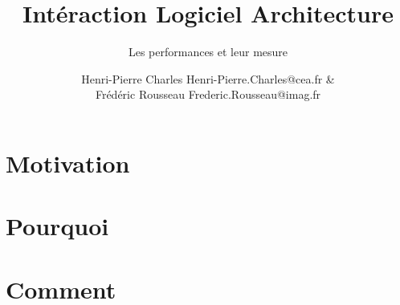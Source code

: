 \documentclass{beamer}
\title{Intéraction Logiciel Architecture}
\subtitle{Les performances et leur mesure}
\author{Henri-Pierre Charles Henri-Pierre.Charles@cea.fr \& \\
Frédéric Rousseau Frederic.Rousseau@imag.fr}
\date{}
\newcommand{\Slide}[1]{}
\begin{document}
\begin{frame}
\titlepage
\end{frame}

\section{Motivation}
\Slide{Metrics/Moore}
\Slide{Metrics/Top500}

\begin{frame}
\tableofcontents[ ] 
\end{frame}
\section{Pourquoi}
\Slide{Metrics/HowToMeasure}
\Slide{Metrics/FLOPS}
\Slide{Metrics/Sustained}
\Slide{Metrics/Lois}
\Slide{Metrics/Speedup}
\Slide{Metrics/Amdahl2}
\Slide{Metrics/Amdahl}
\Slide{Metrics/Roofline}
\Slide{Metrics/Roofline2}

\section{Comment}
\Slide{Comment/gprof}
\Slide{Comment/PerfCounter}
\Slide{Comment/JTAG}
\Slide{Comment/gdb}
\Slide{Comment/qemu}
\end{document}

